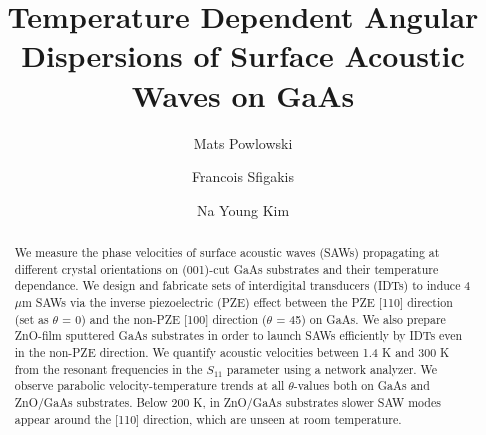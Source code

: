 \documentclass[aps,prb,amsmath,amssymb,footinbib,showpacs,superscriptaddress]{revtex4-1}%
\begin{document}
\title{Temperature Dependent Angular Dispersions of Surface Acoustic Waves on GaAs}
\author{Mats Powlowski} 
\author{Francois Sfigakis}
\author{Na Young Kim}

\begin{abstract}
We measure the phase velocities of surface acoustic waves (SAWs) propagating at different crystal orientations on (001)-cut GaAs substrates and their temperature dependance. We design and fabricate sets of interdigital transducers (IDTs) to induce 4 $\mu$m SAWs via the inverse piezoelectric (PZE) effect between the PZE [110] direction (set as $\theta$ = 0\textdegree) and the non-PZE [100] direction ($\theta$ = 45\textdegree) on GaAs. We also prepare ZnO-film sputtered GaAs substrates in order to launch SAWs efficiently by IDTs even in the non-PZE direction. We quantify acoustic velocities between 1.4 K and 300 K from the resonant frequencies in the $S_{11}$ parameter  using a network analyzer. We observe parabolic velocity-temperature trends at all $\theta$-values both on GaAs and ZnO/GaAs substrates. Below 200 K, in ZnO/GaAs substrates slower SAW modes appear around the [110] direction, which are unseen at room temperature.
\end{abstract}

\maketitle

\end{document}
